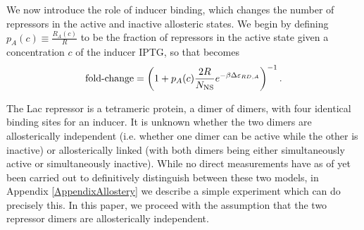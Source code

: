 We now introduce the role of inducer binding, which changes the number of
repressors in the active and inactive allosteric states. We begin by defining
\(p_A(c) \equiv \frac{R_A(c)}{R}\) to be the fraction of repressors in the
active state given a concentration \(c\) of the inducer IPTG, so that %
\eref[eq4] becomes
\begin{equation}
\operatorname{fold-change} = \left( 1+p_A(c) \frac{2 R}{N_{\text{NS}}}e^{-\beta
	\Delta\varepsilon_{RD,A}} \right)^{-1}. \label{eq5}
\end{equation}

The Lac repressor is a tetrameric protein, a dimer of dimers, with four
identical binding sites for an inducer. It is unknown whether the two dimers are
allosterically independent (i.e. whether one dimer can be active while the other
is inactive) or allosterically linked (with both dimers being either
simultaneously active or simultaneously inactive). While no direct measurements
have as of yet been carried out to definitively distinguish between these two
models, in Appendix \ref{AppendixAllostery} we describe a simple experiment
which can do precisely this. In this paper, we proceed with the assumption that
the two repressor dimers are allosterically independent. 

